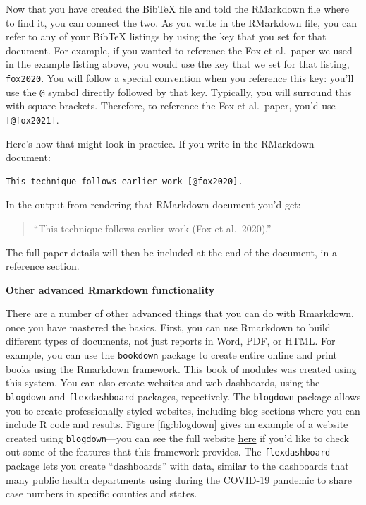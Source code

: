 \documentclass[]{tufte-book}
\begin{document}
Now that you have created the BibTeX file and told the RMarkdown file where to
find it, you can connect the two. As you write in the RMarkdown file, you can
refer to any of your BibTeX listings by using the key that you set for that
document. For example, if you wanted to reference the Fox et al.~paper we
used in the example listing above, you would use the key that we set for
that listing, \texttt{fox2020}.
You will follow a special convention when you reference this key: you'll use the
\texttt{@} symbol directly followed by that key. Typically, you will surround
this with square brackets. Therefore, to reference the Fox et al.~paper,
you'd use \texttt{{[}@fox2021{]}}.

Here's how that might look in practice. If you write in the RMarkdown document:

\begin{verbatim}
This technique follows earlier work [@fox2020].
\end{verbatim}

In the output from rendering that RMarkdown document you'd get:

\begin{quote}
``This technique follows earlier work (Fox et al.~2020).''
\end{quote}

The full paper details will then be included at the end of the document, in a reference
section.

\textbf{Other advanced Rmarkdown functionality}

There are a number of other advanced things that you can do with Rmarkdown, once
you have mastered the basics. First, you can use Rmarkdown to build different
types of documents, not just reports in Word, PDF, or HTML. For example, you can
use the \texttt{bookdown} package to create entire online and print books using the
Rmarkdown framework. This book of modules was created using this system.
You can also create websites and web dashboards, using the \texttt{blogdown} and
\texttt{flexdashboard} packages, repectively. The \texttt{blogdown} package allows you to
create professionally-styled websites, including blog sections where you can
include R code and results. Figure \ref{fig:blogdown} gives an example of a
website created using \texttt{blogdown}---you can see the full website
\href{https://kind-neumann-789611.netlify.app/}{here} if you'd like to check out some
of the features that this framework provides. The \texttt{flexdashboard} package lets
you create ``dashboards'' with data, similar to the dashboards that many public
health departments using during the COVID-19 pandemic to share case numbers in
specific counties and states.
\end{document}

